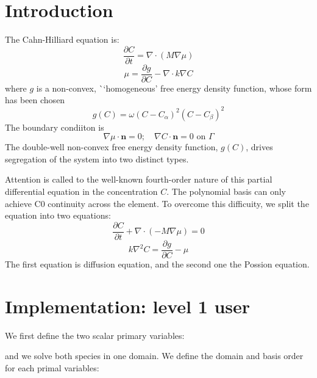 \hypertarget{growth_Introduction}{}\section{Introduction}\label{growth_Introduction}
The Cahn-\/\+Hilliard equation is\+: \[ \frac{\partial C}{\partial t}=\nabla\cdot(M\nabla\mu) \] \[ \mu=\frac{\partial g}{\partial C}-\nabla\cdot k\nabla C \] where $g$ is a non-\/convex, \`{}`homogeneous'\textquotesingle{} free energy density function, whose form has been chosen \[ g(C)=\omega(C-C_\alpha)^2(C-C_\beta)^2 \] The boundary condiiton is \[ \nabla\mu\cdot\boldsymbol{n}=0;\quad \nabla C\cdot\boldsymbol{n}=0 \text{ on }\Gamma \] The double-\/well non-\/convex free energy density function, $g(C)$, drives segregation of the system into two distinct types.

Attention is called to the well-\/known fourth-\/order nature of this partial differential equation in the concentration $C$. The polynomial basis can only achieve C0 continuity across the element. To overcome this difficuity, we split the equation into two equations\+: \[ \frac{\partial C}{\partial t}+\nabla\cdot(-M\nabla\mu)=0 \] \[ k\nabla^2 C=\frac{\partial g}{\partial C}-\mu \] The first equation is diffusion equation, and the second one the Possion equation. \hypertarget{growth_imple}{}\section{Implementation\+: level 1 user}\label{growth_imple}
We first define the two scalar primary variables\+: 
\begin{DoxyCode}{0}
\end{DoxyCode}
 and we solve both species in one domain. We define the domain and basis order for each primal variables\+: 
\begin{DoxyCode}{0}
\end{DoxyCode}
